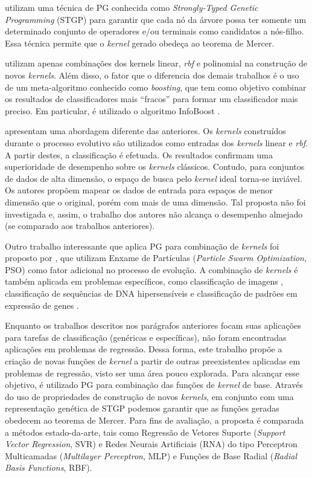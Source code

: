  utilizam uma técnica de PG conhecida como \textit{Strongly-Typed Genetic Programming} (STGP) para garantir que cada nó da árvore possa ter somente um determinado conjunto de operadores e/ou terminais como candidatos a nós-filho. Essa técnica permite que o \textit{kernel} gerado obedeça ao teorema de Mercer.

 utilizam apenas combinações dos kernels linear, \textit{rbf} e polinomial na construção de novos \textit{kernels}. Além disso, o fator que o diferencia dos demais trabalhos é o uso de um meta-algoritmo conhecido como \textit{boosting}, que tem como objetivo combinar os resultados de classificadores mais ``fracos'' para formar um classificador mais preciso. Em particular, é utilizado o algoritmo InfoBoost \cite{aslam2000}.

 apresentam uma abordagem diferente das anteriores. Os \textit{kernels} construídos durante o processo evolutivo são utilizados como entradas dos \textit{kernels} linear e \textit{rbf}. A partir destes, a classificação é efetuada. Os resultados confirmam uma superioridade de desempenho sobre os \textit{kernels} clássicos. Contudo, para conjuntos de dados de alta dimensão, o espaço de busca pelo \textit{kernel} ideal torna-se inviável. Os autores propõem mapear os dados de entrada para espaços de menor dimensão que o original, porém com mais de uma dimensão. Tal proposta não foi investigada e, assim, o trabalho dos autores não alcança o desempenho almejado (se comparado aos trabalhos anteriores).

Outro trabalho interessante que aplica PG para combinação de \textit{kernels} foi proposto por , que utilizam Enxame de Partículas (\textit{Particle Swarm Optimization}, PSO) como fator adicional no processo de evolução. A combinação de \textit{kernels} é também aplicada em problemas específicos, como classificação de imagens \cite{ribeiro2015}, classificação de sequências de DNA hipersensíveis \cite{kamath2011} e classificação de padrões em expressão de genes \cite{cuong2006}.

Enquanto os trabalhos descritos nos parágrafos anteriores focam suas aplicações para tarefas de classificação (genéricas e específicas), não foram encontradas aplicações em problemas de regressão. Dessa forma, este trabalho propõe a criação de novas funções de \textit{kernel} a partir de outras preexistentes aplicadas em problemas de regressão, visto ser uma área pouco explorada. Para alcançar esse objetivo, é utilizado PG para combinação das funções de \textit{kernel} de base. Através do uso de propriedades de construção de novos \textit{kernels}, em conjunto com uma representação genética de STGP podemos garantir que as funções geradas obedecem ao teorema de Mercer. Para fins de avaliação, a proposta é comparada a métodos estado-da-arte, tais como Regressão de Vetores Suporte (\textit{Support Vector Regression}, SVR) e Redes Neurais Artificiais (RNA) do tipo Perceptron Multicamadas (\textit{Multilayer Perceptron}, MLP) e Funções de Base Radial (\textit{Radial Basis Functions}, RBF).

